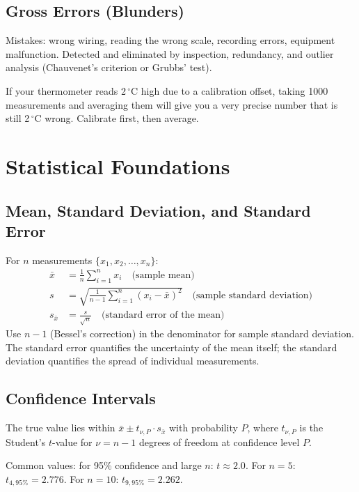 \documentclass[11pt,letterpaper,twoside,openany]{book}
\newcommand{\degC}{\ensuremath{{}^{\circ}\text{C}}}
\begin{document}
\subsection{Gross Errors (Blunders)}
Mistakes: wrong wiring, reading the wrong scale, recording errors, equipment malfunction. Detected and eliminated by inspection, redundancy, and outlier analysis (Chauvenet's criterion or Grubbs' test).

\begin{warningbox}
If your thermometer reads 2\,\degC{} high due to a calibration offset, taking 1000 measurements and averaging them will give you a very precise number that is still 2\,\degC{} wrong. Calibrate first, then average.
\end{warningbox}

\section{Statistical Foundations}

\subsection{Mean, Standard Deviation, and Standard Error}
For $n$ measurements $\{x_1, x_2, \ldots, x_n\}$:
\begin{align}
\bar{x} &= \frac{1}{n} \sum_{i=1}^{n} x_i \quad \text{(sample mean)} \\
s &= \sqrt{\frac{1}{n-1} \sum_{i=1}^{n} (x_i - \bar{x})^2} \quad \text{(sample standard deviation)} \\
s_{\bar{x}} &= \frac{s}{\sqrt{n}} \quad \text{(standard error of the mean)}
\end{align}
Use $n-1$ (Bessel's correction) in the denominator for sample standard deviation. The standard error quantifies the uncertainty of the mean itself; the standard deviation quantifies the spread of individual measurements.

\subsection{Confidence Intervals}
The true value lies within $\bar{x} \pm t_{\nu,P} \cdot s_{\bar{x}}$ with probability $P$, where $t_{\nu,P}$ is the Student's $t$-value for $\nu = n-1$ degrees of freedom at confidence level $P$.

Common values: for 95\% confidence and large $n$: $t \approx 2.0$. For $n = 5$: $t_{4,95\%} = 2.776$. For $n = 10$: $t_{9,95\%} = 2.262$.
\end{document}
